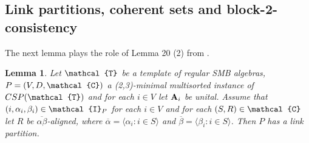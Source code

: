 \documentclass[11pt]{amsart}
\newcommand{\m}[1]{{\uppercase {\mathbf {#1}}}}
\newcommand{\vr}[1]{{\uppercase {\mathcal{#1}}}}
\newcommand{\lb}{\langle}
\newcommand{\rb}{\rangle}
\newtheorem{lm}[thm]{Lemma}
\newtheorem{cor}[thm]{Corollary}
\theoremstyle{definition}
\begin{document}



\subsection{Link partitions, coherent sets and block-2-consistency}

The next lemma plays the role of Lemma 20 (2) from \cite{BuSMB}.

\begin{lm}\label{unitallink}
Let $\vr t$ be a template of regular SMB algebras, $P=(V,D,\vr c)$ a (2,3)-minimal multisorted instance of $CSP(\vr t)$ and for each $i\in V$ let $\m a_i$ be unital. Assume that $(i,\alpha_i,\beta_i)\in \vr i_P$ for each $i\in V$ and for each $(S,R)\in \vr c$ let $R$ be $\overline{\alpha\beta}$-aligned, where $\overline{\alpha}=\lb\alpha_i:i\in S\rb$ and $\overline{\beta}=\lb\beta_i:i\in S\rb$. Then $P$ has a link partition.
\end{lm}
\end{document}
